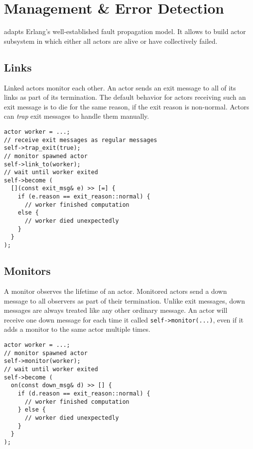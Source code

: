\section{Management \& Error Detection}

\ba adapts Erlang's well-established fault propagation model.
It allows to build actor subsystem in which either all actors are alive or have collectively failed.

\subsection{Links}

Linked actors monitor each other.
An actor sends an exit message to all of its links as part of its termination.
The default behavior for actors receiving such an exit message is to die for the same reason, if the exit reason is non-normal.
Actors can \textit{trap} exit messages to handle them manually.

\begin{lstlisting}
actor worker = ...;
// receive exit messages as regular messages
self->trap_exit(true);
// monitor spawned actor
self->link_to(worker);
// wait until worker exited
self->become (
  [](const exit_msg& e) >> [=] {
    if (e.reason == exit_reason::normal) {
      // worker finished computation
    else {
      // worker died unexpectedly
    }
  }
);
\end{lstlisting}

\subsection{Monitors}
\label{Sec::Management::Monitors}

A monitor observes the lifetime of an actor.
Monitored actors send a down message to all observers as part of their termination.
Unlike exit messages, down messages are always treated like any other ordinary message.
An actor will receive one down message for each time it called \lstinline^self->monitor(...)^, even if it adds a monitor to the same actor multiple times.

\begin{lstlisting}
actor worker = ...;
// monitor spawned actor
self->monitor(worker);
// wait until worker exited
self->become (
  on(const down_msg& d) >> [] {
    if (d.reason == exit_reason::normal) {
      // worker finished computation
    } else {
      // worker died unexpectedly
    }
  }
);
\end{lstlisting}

